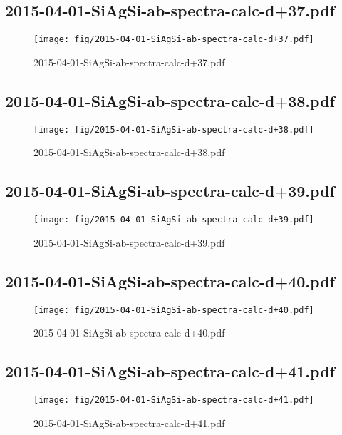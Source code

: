 \documentclass[fullscreen=true]{beamer}
\begin{document}
\subsection{2015-04-01-SiAgSi-ab-spectra-calc-d+37.pdf}
\begin{frame}
  \begin{figure}
    \texttt{[image: fig/2015-04-01-SiAgSi-ab-spectra-calc-d+37.pdf]}%
    \caption{2015-04-01-SiAgSi-ab-spectra-calc-d+37.pdf}
  \end{figure}
\end{frame}

\subsection{2015-04-01-SiAgSi-ab-spectra-calc-d+38.pdf}
\begin{frame}
  \begin{figure}
    \texttt{[image: fig/2015-04-01-SiAgSi-ab-spectra-calc-d+38.pdf]}%
    \caption{2015-04-01-SiAgSi-ab-spectra-calc-d+38.pdf}
  \end{figure}
\end{frame}

\subsection{2015-04-01-SiAgSi-ab-spectra-calc-d+39.pdf}
\begin{frame}
  \begin{figure}
    \texttt{[image: fig/2015-04-01-SiAgSi-ab-spectra-calc-d+39.pdf]}%
    \caption{2015-04-01-SiAgSi-ab-spectra-calc-d+39.pdf}
  \end{figure}
\end{frame}

\subsection{2015-04-01-SiAgSi-ab-spectra-calc-d+40.pdf}
\begin{frame}
  \begin{figure}
    \texttt{[image: fig/2015-04-01-SiAgSi-ab-spectra-calc-d+40.pdf]}%
    \caption{2015-04-01-SiAgSi-ab-spectra-calc-d+40.pdf}
  \end{figure}
\end{frame}

\subsection{2015-04-01-SiAgSi-ab-spectra-calc-d+41.pdf}
\begin{frame}
  \begin{figure}
    \texttt{[image: fig/2015-04-01-SiAgSi-ab-spectra-calc-d+41.pdf]}%
    \caption{2015-04-01-SiAgSi-ab-spectra-calc-d+41.pdf}
  \end{figure}
\end{frame}
\end{document}
